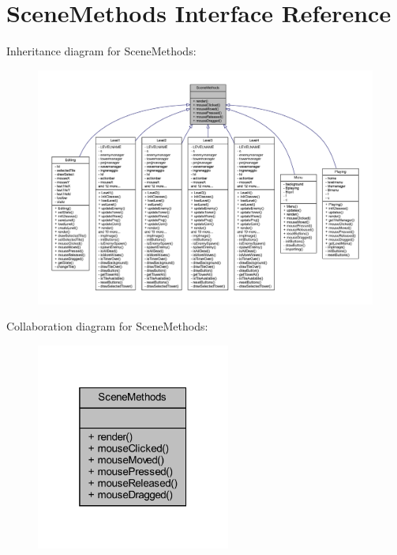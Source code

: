 \hypertarget{interfacescenes_1_1_scene_methods}{}\section{Scene\+Methods Interface Reference}
\label{interfacescenes_1_1_scene_methods}


Inheritance diagram for Scene\+Methods\+:\nopagebreak
\begin{figure}[H]
\begin{center}
\leavevmode
\includegraphics[width=350pt]{interfacescenes_1_1_scene_methods__inherit__graph}
\end{center}
\end{figure}


Collaboration diagram for Scene\+Methods\+:\nopagebreak
\begin{figure}[H]
\begin{center}
\leavevmode
\includegraphics[width=181pt]{interfacescenes_1_1_scene_methods__coll__graph}
\end{center}
\end{figure}
